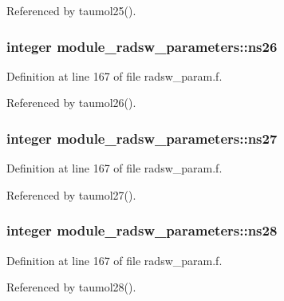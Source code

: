 Referenced by taumol25().

\subsubsection[{\texorpdfstring{ns26}{ns26}}]{\setlength{\rightskip}{0pt plus 5cm}integer module\+\_\+radsw\+\_\+parameters\+::ns26}\hypertarget{group__module__radsw__main_ga3cf6dd031ffa5545db46bb1b54fe42b6}{}\label{group__module__radsw__main_ga3cf6dd031ffa5545db46bb1b54fe42b6}


Definition at line 167 of file radsw\+\_\+param.\+f.



Referenced by taumol26().

\subsubsection[{\texorpdfstring{ns27}{ns27}}]{\setlength{\rightskip}{0pt plus 5cm}integer module\+\_\+radsw\+\_\+parameters\+::ns27}\hypertarget{group__module__radsw__main_ga801c6d2223877ddf3f633dc7ffcd528b}{}\label{group__module__radsw__main_ga801c6d2223877ddf3f633dc7ffcd528b}


Definition at line 167 of file radsw\+\_\+param.\+f.



Referenced by taumol27().

\subsubsection[{\texorpdfstring{ns28}{ns28}}]{\setlength{\rightskip}{0pt plus 5cm}integer module\+\_\+radsw\+\_\+parameters\+::ns28}\hypertarget{group__module__radsw__main_gac2b720c6b0ab80759cfe83aa53fb4540}{}\label{group__module__radsw__main_gac2b720c6b0ab80759cfe83aa53fb4540}


Definition at line 167 of file radsw\+\_\+param.\+f.



Referenced by taumol28().

